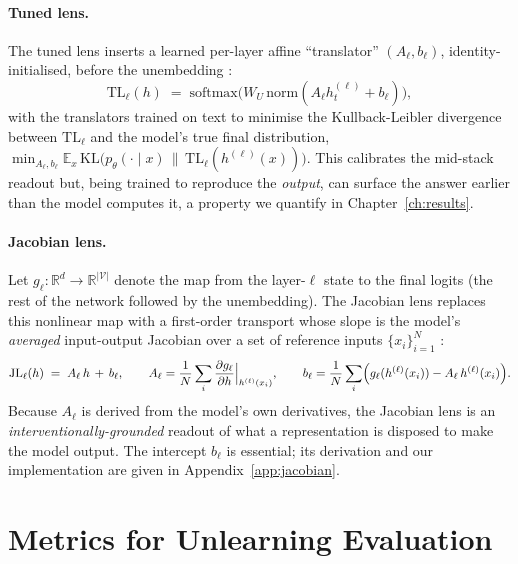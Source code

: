 \paragraph{Tuned lens.}
The tuned lens inserts a learned per-layer affine ``translator'' $(A_\ell, b_\ell)$, identity-initialised,
before the unembedding \citep{belrose2023tunedlens}:
\begin{equation}
  \mathrm{TL}_\ell(h) \;=\; \mathrm{softmax}\bigl(W_U\,\mathrm{norm}(A_\ell h^{(\ell)}_t + b_\ell)\bigr),
  \label{eq:tunedlens}
\end{equation}
with the translators trained on text to minimise the Kullback-Leibler divergence between $\mathrm{TL}_\ell$
and the model's true final distribution, $\min_{A_\ell,b_\ell} \mathbb{E}_x\,
\mathrm{KL}\bigl(p_\theta(\cdot\mid x)\,\|\,\mathrm{TL}_\ell(h^{(\ell)}(x))\bigr)$. This calibrates the
mid-stack readout but, being trained to reproduce the \emph{output}, can surface the answer earlier than
the model computes it, a property we quantify in Chapter~\ref{ch:results}.

\paragraph{Jacobian lens.}
Let $g_\ell : \mathbb{R}^d \to \mathbb{R}^{|\mathcal{V}|}$ denote the map from the layer-$\ell$ state to the
final logits (the rest of the network followed by the unembedding). The Jacobian lens replaces this
nonlinear map with a first-order transport whose slope is the model's \emph{averaged} input-output
Jacobian over a set of reference inputs $\{x_i\}_{i=1}^N$ \citep{anthropic2026workspace}:
\begin{equation}
  \mathrm{JL}_\ell(h) \;=\; A_\ell\,h \,+\, b_\ell, \qquad
  A_\ell = \frac{1}{N}\sum_i \frac{\partial g_\ell}{\partial h}\Big|_{h^{(\ell)}(x_i)}, \qquad
  b_\ell = \frac{1}{N}\sum_i \Bigl(g_\ell(h^{(\ell)}(x_i)) - A_\ell\,h^{(\ell)}(x_i)\Bigr).
  \label{eq:jaclens}
\end{equation}
Because $A_\ell$ is derived from the model's own derivatives, the Jacobian lens is an
\emph{interventionally-grounded} readout of what a representation is disposed to make the model output. The intercept $b_\ell$ is essential; its
derivation and our implementation are given in Appendix~\ref{app:jacobian}.

\section{Metrics for Unlearning Evaluation}
\label{sec:bg-metrics}


